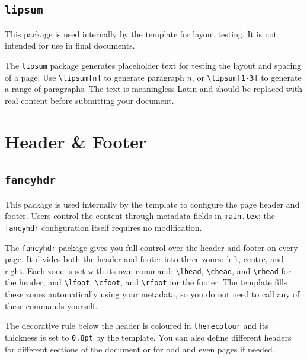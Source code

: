 \subsection{\texttt{lipsum}}
\noindent\colorbox{themecolour!15}{\parbox{\linewidth}{\small This package is used internally by the template for layout testing. It is not intended for use in final documents.}}\vspace{0.5\baselineskip}

The \texttt{lipsum} package generates placeholder text for testing the layout and spacing of a page. Use \texttt{\textbackslash lipsum[n]} to generate paragraph $n$, or \texttt{\textbackslash lipsum[1-3]} to generate a range of paragraphs. The text is meaningless Latin and should be replaced with real content before submitting your document.

\lipsum[1]

\section{Header \& Footer}

\subsection{\texttt{fancyhdr}}
\noindent\colorbox{themecolour!15}{\parbox{\linewidth}{\small This package is used internally by the template to configure the page header and footer. Users control the content through metadata fields in \texttt{main.tex}; the \texttt{fancyhdr} configuration itself requires no modification.}}\vspace{0.5\baselineskip}

The \texttt{fancyhdr} package gives you full control over the header and footer on every page. It divides both the header and footer into three zones: left, centre, and right. Each zone is set with its own command: \texttt{\textbackslash lhead}, \texttt{\textbackslash chead}, and \texttt{\textbackslash rhead} for the header, and \texttt{\textbackslash lfoot}, \texttt{\textbackslash cfoot}, and \texttt{\textbackslash rfoot} for the footer. The template fills these zones automatically using your metadata, so you do not need to call any of these commands yourself.

The decorative rule below the header is coloured in \texttt{themecolour} and its thickness is set to \texttt{0.8pt} by the template. You can also define different headers for different sections of the document or for odd and even pages if needed.

